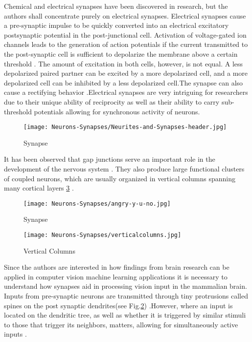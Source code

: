 \documentclass[12pt]{report}
\begin{document}
Chemical and electrical synapses have been discovered in research, but the authors shall concentrate purely on electrical synapses. Electrical synapses cause a pre-synaptic impulse to be quickly converted into an electrical excitatory postsynaptic potential in the post-junctional cell. Activation of voltage-gated ion channels leads to the generation of action potentials if the current transmitted to the post-synaptic cell is sufficient to depolarize the membrane above a certain threshold \cite{Hormuzdi2004}. The amount of excitation in both cells, however, is not equal. A less depolarized paired partner can be excited by a more depolarized cell, and a more depolarized cell can be inhibited by a less depolarized cell.The synapse can also cause a rectifying behavior \cite{Furshpan1959}.Electrical synapses are very intriguing for researchers due to their unique ability of reciprocity as well as their ability to carry sub-threshold potentials allowing for synchronous activity of neurons.

\begin{figure}[htp]
    \centering
    \texttt{[image: Neurons-Synapses/Neurites-and-Synapses-header.jpg]}
    \caption{Synapse}
    \label{fig:synapse}
\end{figure}

It has been observed that gap junctions serve an important role in the development of the nervous system \cite{Fischbach1972}. They also produce large functional clusters of coupled neurons, which are usually organized in vertical columns spanning many cortical layers\cite{Peinado1993}\cite{Yuste1992} \ref{fig:verticalcolumns} .


\begin{figure}[htp]
    \centering
    \texttt{[image: Neurons-Synapses/angry-y-u-no.jpg]}
    \caption{Synapse}
    \label{fig:spines}
\end{figure}

\begin{figure}[htp]
    \centering
    \texttt{[image: Neurons-Synapses/verticalcolumns.jpg]}
    \caption{Vertical Columns \cite{molnar2020}}
    \label{fig:verticalcolumns}
\end{figure}
Since the authors are interested in how findings from brain research can be applied in computer vision machine learning applications it is necessary to understand how synapses aid in processing vision input in the mammalian brain. Inputs from pre-synaptic neurons are transmitted through tiny protrusions called spines on the post synaptic dendrites(see Fig.\ref{fig:spines}) \cite{tobias2017}.However, where an input is located on the dendritic tree, as well as whether it is triggered by similar stimuli to those that trigger its neighbors, matters, allowing for simultaneously active inputs \cite{London2005}.
\end{document}
